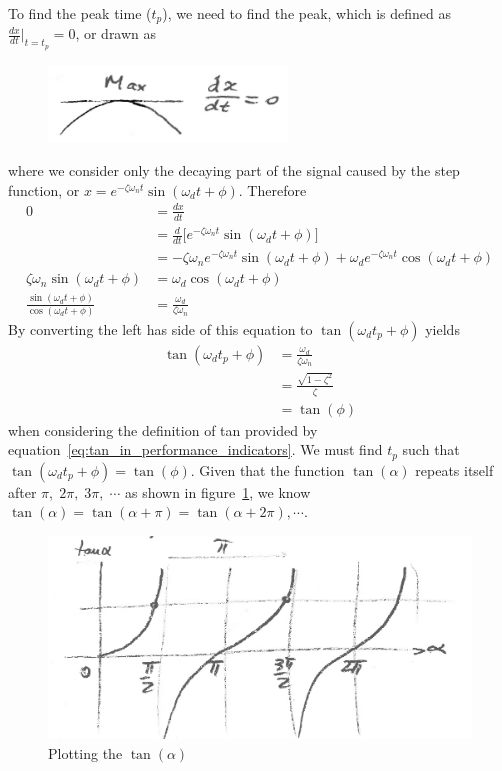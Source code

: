 \documentclass[12pt,letter]{article}
\begin{document}
To find the peak time ($t_p$), we need to find the peak, which is defined as $\frac{dx}{dt}\big|_{t=t_p} = 0$, or drawn as
\begin{figure}[H]
	\centering
	\includegraphics[width=2.5in]{../figures/t_p_max.png}
\end{figure}
where we consider only the decaying part of the signal caused by the step function, or $x=e^{-\zeta \omega_n t} \sin (\omega_d t + \phi)$. Therefore
\begin{align}
0 &= \frac{dx}{dt}  \\
 &= \frac{d}{dt} \bigg[  e^{-\zeta \omega_n t} \sin (\omega_d t + \phi)   \bigg]  \nonumber \\
 &= - \zeta \omega_n e^{-\zeta \omega_n t} \sin (\omega_d t + \phi) + \omega_d e^{-\zeta \omega_n t} \cos (\omega_d t + \phi) \nonumber \\
\zeta \omega_n \sin (\omega_d t + \phi) &= \omega_d \cos (\omega_d t + \phi) \nonumber \\
\frac{\sin (\omega_d t + \phi)}{\cos (\omega_d t + \phi)} & = \frac{\omega_d}{\zeta \omega_n}  \nonumber
\end{align}
By converting the left has side of this equation to $\tan (\omega_d t_p + \phi)$ yields
\begin{align}
\label{eq:tan_of_phi}
\tan (\omega_d t_p + \phi) &= \frac{\omega_d}{\zeta \omega_n} \\
&= \frac{\sqrt{1-\zeta^2} }{\zeta} \nonumber \\
&= \tan(\phi) \nonumber
\end{align}
when considering the definition of tan provided by equation~\ref{eq:tan_in_performance_indicators}. We must find $t_p$ such that $\tan(\omega_d t_p + \phi) = \tan(\phi)$. Given that the function $\tan(\alpha)$ repeats itself after $\pi, \; 2\pi, \; 3\pi, \; \cdots$ as shown in figure~\ref{fig:tan_of_alpha}, we know $\tan(\alpha) = \tan(\alpha + \pi) = \tan(\alpha + 2\pi), \cdots $.  
\begin{figure}[H]
	\centering
	\includegraphics[width=4.5in]{../figures/tan_of_alpha.png}
	\caption{Plotting the $ \tan(\alpha)$}
	\label{fig:tan_of_alpha}
\end{figure}
\end{document}
